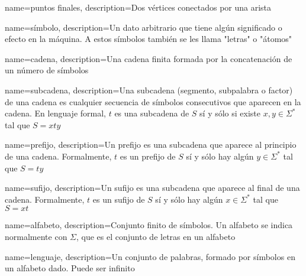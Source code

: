 

{
	name=puntos finales,
	description={Dos vértices conectados por una arista}
}

{
	name=símbolo,
	description={Un dato arbitrario que tiene algún significado o efecto en la máquina. A estos símbolos también se les llama "letras" o "átomos"}
}

{
	name=cadena,
	description={Una cadena finita formada por la concatenación de un número de símbolos}
}

{
	name=subcadena,
	description={Una subcadena (segmento, subpalabra o factor) de una cadena es cualquier secuencia de símbolos consecutivos que aparecen en la cadena. En lenguaje formal, $t$ es una subcadena de $S$ sí y sólo si existe $x, y \in \Sigma^\ast$ tal que $S = xty$
	}
}

{
	name=prefijo,
	description={Un prefijo es una subcadena que aparece al principio de una cadena. Formalmente, $t$ es un prefijo de $S$ sí y sólo hay algún $y \in \Sigma^\ast$ tal que $S = ty$}
}

{
	name=sufijo,
	description={Un sufijo es una subcadena que aparece al final de una cadena. Formalmente, $t$ es un sufijo de $S$ sí y sólo hay algún $x \in \Sigma^\ast$ tal que $S = xt$}
}


{
	name=alfabeto,
	description={Conjunto finito de símbolos. Un alfabeto se indica normalmente con $\Sigma$, que es el conjunto de letras en un alfabeto}
}

{
	name=lenguaje,
	description={Un conjunto de palabras, formado por símbolos en un alfabeto dado. Puede ser infinito}
}

